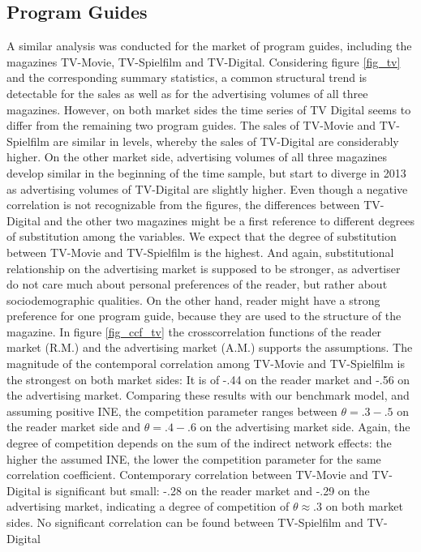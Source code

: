 \documentclass[12pt,a4paper]{scrreprt}
\begin{document}
\subsection{Program Guides}
A similar analysis was conducted for the market of program guides, including the magazines TV-Movie, TV-Spielfilm and TV-Digital. Considering figure \ref{fig_tv} and the corresponding summary statistics, a common structural trend is detectable for the sales as well as for the advertising volumes of all three magazines. However, on both market sides the time series of TV Digital seems to differ from the remaining two program guides. The sales of TV-Movie and TV-Spielfilm are similar in levels, whereby the sales of TV-Digital are considerably higher. On the other market side, advertising volumes of all three magazines develop similar in the beginning of the time sample, but start to diverge in 2013 as advertising volumes of TV-Digital are slightly higher. Even though a negative correlation is not recognizable from the figures, the differences between TV-Digital and the other two magazines might be a first reference to different degrees of substitution among the variables. We expect that the degree of substitution between TV-Movie and TV-Spielfilm is the highest. And again, substitutional relationship on the advertising market is supposed to be stronger, as advertiser do not care much about personal preferences of the reader, but rather about sociodemographic qualities. On the other hand, reader might have a strong preference for one program guide, because they are used to the structure of the magazine. 
In figure \ref{fig_ccf_tv} the crosscorrelation functions of the reader market (R.M.) and the advertising market (A.M.) supports the assumptions. The magnitude of the contemporal correlation among TV-Movie and TV-Spielfilm is the strongest on both market sides: It is of -.44 on the reader market and -.56 on the advertising market. Comparing these results with our benchmark model, and assuming positive INE, the competition parameter ranges between $\theta=.3-.5$ on the reader market side and $\theta=.4-.6$ on the advertising market side. Again, the degree of competition depends on the sum of the indirect network effects: the higher the assumed INE, the lower the competition parameter for the same correlation coefficient. Contemporary correlation between TV-Movie and TV-Digital is significant but small: -.28 on the reader market and -.29 on the advertising market, indicating a degree of competition of $\theta\approx.3$ on both market sides. No significant correlation can be found between TV-Spielfilm and TV-Digital
\end{document}
